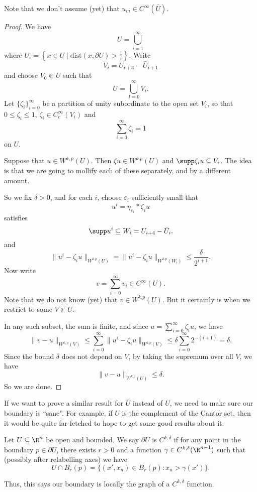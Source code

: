 \documentclass[a4paper]{article}
\begin{document}
Note that we don't assume (yet) that $u_m \in C^\infty(\bar{U})$.
\begin{proof}
  We have
  \[
    U = \bigcup_{i = 1}^\infty
  \]
  where $U_i = \left\{x \in U \mid \mathrm{dist}(x, \partial U) > \frac{1}{i}\right\}$. Write
  \[
    V_i = U_{i + 3} - \bar{U}_{i + 1}
  \]
  and choose $V_0 \Subset U$ such that
  \[
    U = \bigcup_{I = 0}^\infty V_i.
  \]
  Let $\{\zeta_i\}_{i = 0}^\infty$ be a partition of unity subordinate to the open set $V_i$, so that $0 \leq \zeta_i \leq 1$, $\zeta_i \in C_c^\infty(V_i)$ and
  \[
    \sum_{i = 0}^\infty \zeta_i = 1
  \]
  on $U$.

  Suppose that $u \in W^{k, p}(U)$. Then $\zeta u \in W^{k. p}(U)$ and $\supp \zeta_i u \subseteq V_i$. The idea is that we are going to mollify each of these separately, and by a different amount.

  So we fix $\delta > 0$, and for each $i$, choose $\varepsilon_i$ sufficiently small that
  \[
    u^i = \eta_{\varepsilon_i} * \zeta_i u
  \]
  satisfies
  \[
    \supp u^i \subseteq W_i = U_{i + 4} - \bar{U}_i.
  \]
  and
  \[
    \|u^i - \zeta_i u\|_{W^{k. p}(U)} = \|u^i - \zeta_i u\|_{W^{k. p}(W_i)} \leq \frac{\delta}{2^{i + 1}}.
  \]
  Now write
  \[
    v = \sum_{i = 0}^\infty v_i \in C^\infty(U).
  \]
  Note that we do not know (yet) that $v \in W^{k. p}(U)$. But it certainly is when we restrict to some $V \Subset U$.

  In any such subset, the sum is finite, and since $u = \sum_{i = 0}^\infty \zeta_i u$, we have
  \[
    \|v - u\|_{W^{k, p}(V)} \leq \sum_{i = 0}^\infty \|u^i - \zeta_i u\|_{W^{k. p}(V)} \leq \delta \sum_{i = 0}^\infty 2^{-(i + 1)} = \delta.
  \]
  Since the bound $\delta$ does not depend on $V$, by taking the supremum over all $V$, we have
  \[
    \|v - u\|_{W^{k. p}(U)} \leq \delta.
  \]
  So we are done.
\end{proof}

If we want to prove a similar result for $\bar{U}$ instead of $U$, we need to make sure our boundary is ``sane''. For example, if $U$ is the complement of the Cantor set, then it would be quite far-fetched to hope to get some good results about it.

\begin{defi}
  Let $U \subseteq \R^n$ be open and bounded. We say $\partial U$ is $C^{k, \delta}$ if for any point in the boundary $p \in \partial U$, there exists $r > 0$ and a function $\gamma \in C^{k, \delta}(\R^{n - 1})$ such that (possibly after relabelling axes) we have
  \[
    U \cap B_r(p) = \{(x', x_n) \in B_r(p): x_n > \gamma(x')\}.
  \]
\end{defi}
Thus, this says our boundary is locally the graph of a $C^{k, \delta}$ function.
\end{document}
